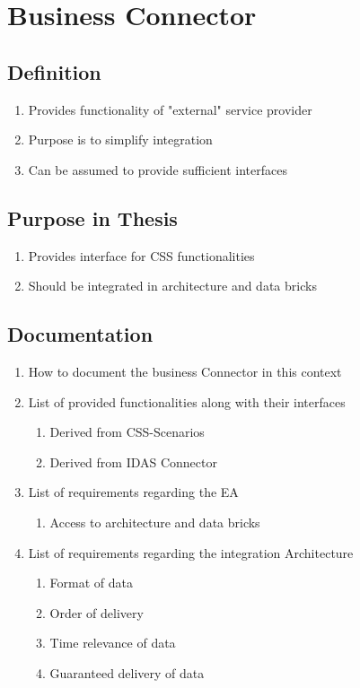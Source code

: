 \documentclass[
     12pt,         %
     a4paper,      %
     BCOR10mm,     %
     DIV14,        %
     ]{scrreprt}
\begin{document}
\section{Business Connector}

\subsection{Definition}
\begin{enumerate}
     \item Provides functionality of "external" service provider
     \item Purpose is to simplify integration
     \item Can be assumed to provide sufficient interfaces
\end{enumerate}

\subsection{Purpose in Thesis}
\begin{enumerate}
     \item Provides interface for CSS functionalities
     \item Should be integrated in architecture and data bricks
\end{enumerate}

\subsection{Documentation}
\begin{enumerate}
     \item How to document the business Connector in this context

     \item List of provided functionalities along with their interfaces
           \begin{enumerate}
                \item Derived from CSS-Scenarios
                \item Derived from IDAS Connector
           \end{enumerate}

     \item List of requirements regarding the EA
           \begin{enumerate}
                \item Access to architecture and data bricks
           \end{enumerate}

     \item List of requirements regarding the integration Architecture
           \begin{enumerate}
                \item Format of data
                \item Order of delivery
                \item Time relevance of data
                \item Guaranteed delivery of data
           \end{enumerate}

\end{enumerate}
\end{document}
